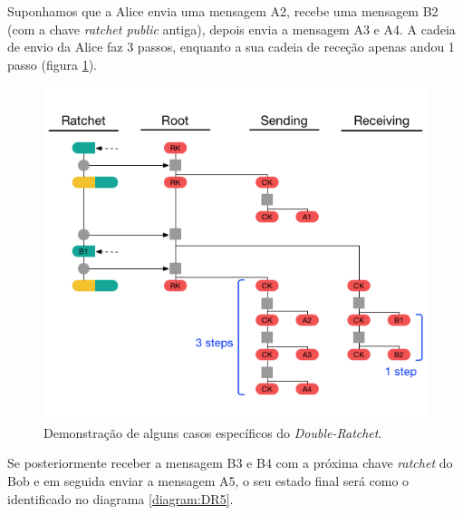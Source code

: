 Suponhamos que a Alice envia uma mensagem A2, recebe uma mensagem B2 (com a chave \textit{ratchet public} antiga), depois envia a mensagem A3 e A4. A cadeia de envio da Alice faz 3 passos, enquanto a sua cadeia de receção apenas andou 1 passo (figura \ref{diagram:DR4}).

\begin{figure}[H]
\begin{center}
\includegraphics[width=12cm]{img/DR4.png}
\caption{Demonstração de alguns casos específicos do \textit{Double-Ratchet}.}
\label{diagram:DR4} 
\centering
\end{center}
\end{figure}

Se posteriormente receber a mensagem B3 e B4 com a próxima chave \textit{ratchet} do Bob e em seguida enviar a mensagem A5, o seu estado final será como o identificado no diagrama \ref{diagram:DR5}.

